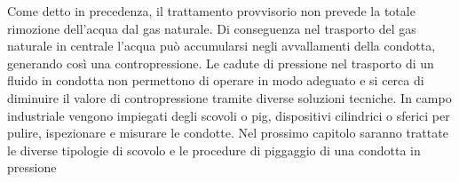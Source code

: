 Come detto in precedenza, il trattamento provvisorio non prevede la totale rimozione dell'acqua dal gas naturale. Di conseguenza nel trasporto del gas naturale in centrale l'acqua può accumularsi negli avvallamenti della condotta, generando così una contropressione. Le cadute di pressione nel trasporto di un fluido in condotta non permettono di operare in modo adeguato e si cerca di diminuire il valore di contropressione tramite diverse soluzioni tecniche. In campo industriale vengono impiegati degli scovoli o pig, dispositivi cilindrici o sferici per pulire, ispezionare e misurare le condotte. Nel prossimo capitolo saranno trattate le diverse tipologie di scovolo e le procedure di piggaggio di una condotta in pressione